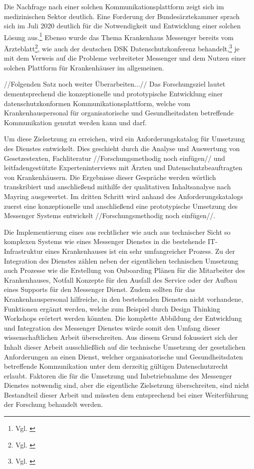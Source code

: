 Die Nachfrage nach einer solchen Kommunikationsplattform zeigt sich im medizinischen Sektor deutlich. Eine Forderung der Bundesärztekammer sprach sich im Juli 2020 deutlich für die Notwendigkeit und Entwicklung einer solchen Lösung aus.\footnote{Vgl. \cite{Bundesaerztekammer2019}} Ebenso wurde das Thema Krankenhaus Messenger bereits vom Ärzteblatt\footnote{Vgl. \cite{Giesselmann2018}}, wie auch der deutschen DSK Datenschutzkonferenz behandelt,\footnote{Vgl. \cite{Datenschutzkonferenz2019}} je mit dem Verweis auf die Probleme verbreiteter Messenger und dem Nutzen einer solchen Plattform für Krankenhäuser im allgemeinen.

//Folgenden Satz noch weiter Überarbeiten...//
Das Forschungsziel lautet dementsprechend die konzeptionelle und prototypische Entwicklung einer datenschutzkonformen Kommunikationsplattform, welche vom Krankenhauspersonal für organisatorische und Gesundheitsdaten betreffende Kommunikation genutzt werden kann und darf. 

Um diese Zielsetzung zu erreichen, wird ein Anforderungskatalog für Umsetzung des Dienstes entwickelt. Dies geschieht durch die Analyse und Auswertung von Gesetzestexten, Fachliteratur //Forschungsmethodig noch einfügen// und leitfadengestützte Experteninterviews mit Ärzten und Datenschutzbeauftragten von Krankenhäusern. Die Ergebnisse dieser Gespräche werden wörtlich transkribiert und anschließend mithilfe der qualitativen Inhaltsanalyse nach Mayring ausgewertet. Im dritten Schritt wird anhand des Anforderungskatalogs zuerst eine konzeptionelle und anschließend eine prototypische Umsetzung des Messenger Systems entwickelt //Forschungsmethodig noch einfügen//.

Die Implementierung eines aus rechtlicher wie auch aus technischer Sicht so komplexen Systems wie eines Messenger Dienstes in die bestehende IT-Infrastruktur eines Krankenhauses ist ein sehr umfangreicher Prozess. Zu der Integration des Dienstes zählen neben der eigentlichen technischen Umsetzung auch Prozesse wie die Erstellung von Onboarding Plänen für die Mitarbeiter des Krankenhauses, Notfall Konzepte für den Ausfall des Service oder der Aufbau eines Supports für den Messenger Dienst. Zudem sollten für das Krankenhauspersonal hilfreiche, in den bestehenden Diensten nicht vorhandene, Funktionen ergänzt werden, welche zum Beispiel durch Design Thinking Workshops erörtert werden könnten. Die komplette Abbildung der Entwicklung und Integration des Messenger Dienstes würde somit den Umfang dieser wissenschaftlichen Arbeit überschreiten. Aus diesem Grund fokussiert sich der Inhalt dieser Arbeit ausschließlich auf die technische Umsetzung der gesetzlichen Anforderungen an einen Dienst, welcher organisatorische und Gesundheitsdaten betreffende Kommunikation unter dem derzeitig gültigen Datenschutzrecht erlaubt. Faktoren die für die Umsetzung und Inbetriebnahme des Messenger Dienstes notwendig sind, aber die eigentliche Zielsetzung überschreiten, sind nicht Bestandteil dieser Arbeit und müssten dem entsprechend bei einer Weiterführung der Forschung behandelt werden.

